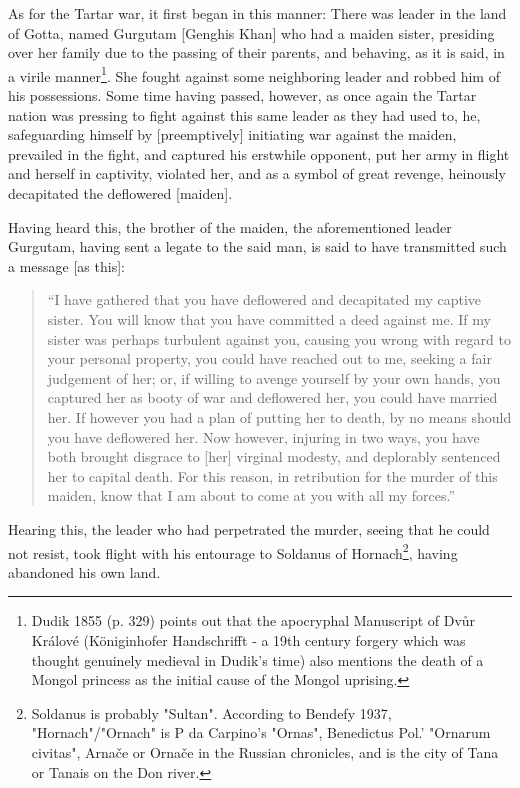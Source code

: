 As for the Tartar war, it first began in this manner: There was leader in the land of Gotta, named Gurgutam [Genghis Khan] who had a maiden sister, presiding over her family due to the passing of their parents, and behaving, as it is said, in a virile manner\footnote{
Dudik 1855 (p. 329) points out that the apocryphal Manuscript of Dvůr Králové (Königinhofer Handschrifft - a 19th century forgery which was thought genuinely medieval in Dudik's time) also mentions the death of a Mongol princess as the initial cause of the Mongol uprising.}.  She fought against some neighboring leader and robbed him of his possessions. Some time having passed, however, as once again the Tartar nation was pressing to fight against this same leader as they had used to, he, safeguarding himself by [preemptively] initiating war against the maiden, prevailed in the fight, and captured his erstwhile opponent, put her army in flight and herself in captivity, violated her, and as a symbol of great revenge, heinously decapitated the deflowered [maiden].


Having heard this, the brother of the maiden, the aforementioned leader Gurgutam, having sent a legate to the said man, is said to have transmitted such a message [as this]: 

\begin{quote}
``I have gathered that you have deflowered and decapitated my captive sister. You will know that you have committed a deed against me. If my sister was perhaps turbulent against you, causing you wrong with regard to your personal property, you could have reached out to me, seeking a fair judgement of her; or, if willing to avenge yourself by your own hands, you captured her as booty of war and deflowered her, you could have married her. If however you had a plan of putting her to death, by no means should you have deflowered her. Now however, injuring in two ways, you have both brought disgrace to [her] virginal modesty, and deplorably sentenced her to capital death. For this reason, in retribution for the murder of this maiden, know that I am about to come at you with all my forces.'' 
\end{quote}

Hearing this, the leader who had perpetrated the murder, seeing that he could not resist, took flight with his entourage to Soldanus of Hornach\footnote{Soldanus is probably "Sultan". According to Bendefy 1937, "Hornach"/"Ornach" is P da Carpino's "Ornas", Benedictus Pol.' "Ornarum civitas", Arnače or Ornače in the Russian chronicles, and is the city of Tana or Tanais on the Don river.}, having abandoned his own land. 

